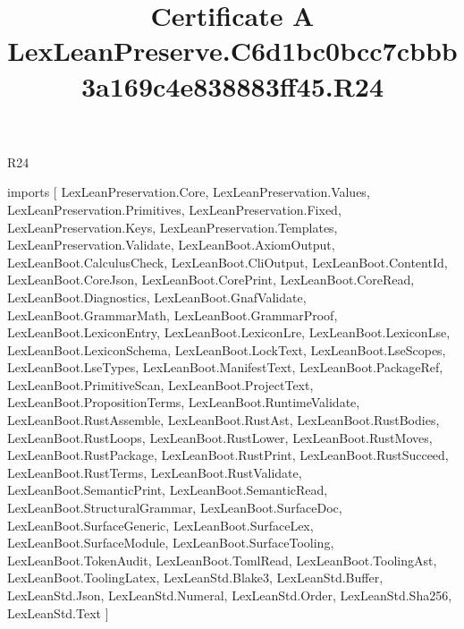 \begin{lexlean}{R24}
\title{Certificate A LexLeanPreserve.C6d1bc0bcc7cbbb3a169c4e838883ff45.R24}
\begin{coremodule}
imports [
  LexLeanPreservation.Core,
  LexLeanPreservation.Values,
  LexLeanPreservation.Primitives,
  LexLeanPreservation.Fixed,
  LexLeanPreservation.Keys,
  LexLeanPreservation.Templates,
  LexLeanPreservation.Validate,
  LexLeanBoot.AxiomOutput,
  LexLeanBoot.CalculusCheck,
  LexLeanBoot.CliOutput,
  LexLeanBoot.ContentId,
  LexLeanBoot.CoreJson,
  LexLeanBoot.CorePrint,
  LexLeanBoot.CoreRead,
  LexLeanBoot.Diagnostics,
  LexLeanBoot.GnafValidate,
  LexLeanBoot.GrammarMath,
  LexLeanBoot.GrammarProof,
  LexLeanBoot.LexiconEntry,
  LexLeanBoot.LexiconLre,
  LexLeanBoot.LexiconLse,
  LexLeanBoot.LexiconSchema,
  LexLeanBoot.LockText,
  LexLeanBoot.LseScopes,
  LexLeanBoot.LseTypes,
  LexLeanBoot.ManifestText,
  LexLeanBoot.PackageRef,
  LexLeanBoot.PrimitiveScan,
  LexLeanBoot.ProjectText,
  LexLeanBoot.PropositionTerms,
  LexLeanBoot.RuntimeValidate,
  LexLeanBoot.RustAssemble,
  LexLeanBoot.RustAst,
  LexLeanBoot.RustBodies,
  LexLeanBoot.RustLoops,
  LexLeanBoot.RustLower,
  LexLeanBoot.RustMoves,
  LexLeanBoot.RustPackage,
  LexLeanBoot.RustPrint,
  LexLeanBoot.RustSucceed,
  LexLeanBoot.RustTerms,
  LexLeanBoot.RustValidate,
  LexLeanBoot.SemanticPrint,
  LexLeanBoot.SemanticRead,
  LexLeanBoot.StructuralGrammar,
  LexLeanBoot.SurfaceDoc,
  LexLeanBoot.SurfaceGeneric,
  LexLeanBoot.SurfaceLex,
  LexLeanBoot.SurfaceModule,
  LexLeanBoot.SurfaceTooling,
  LexLeanBoot.TokenAudit,
  LexLeanBoot.TomlRead,
  LexLeanBoot.ToolingAst,
  LexLeanBoot.ToolingLatex,
  LexLeanStd.Blake3,
  LexLeanStd.Buffer,
  LexLeanStd.Json,
  LexLeanStd.Numeral,
  LexLeanStd.Order,
  LexLeanStd.Sha256,
  LexLeanStd.Text
]


\end{coremodule}
\end{lexlean}
